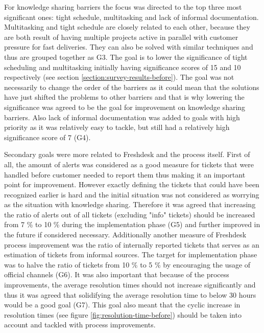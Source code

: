 For knowledge sharing barriers the focus was directed to the top three most significant ones: tight schedule, multitasking and lack of informal documentation. Multitasking and tight schedule
are closely related to each other, because they are both result of having multiple projects active in parallel with customer pressure for fast deliveries. They can also be solved with
similar techniques and thus are grouped together as G3. The goal is to lower the significance of tight scheduling and multitasking initially having significance scores of 15 and 10 respectively
(see section \ref{section:survey-results-before}). The goal was not necessarily to change the order of the barriers as it could mean that the solutions have just shifted the problems to other
barriers and that is why lowering the significance was agreed to be the goal for improvement on knowledge sharing barriers. Also lack of informal documentation was added to goals with high
priority as it was relatively easy to tackle, but still had a relatively high significance score of 7 (G4).

Secondary goals were more related to Freshdesk and the process itself. First of all, the amount of alerts was considered as a good measure for tickets that were handled before
customer needed to report them thus making it an important point for improvement. However exactly defining the tickets that could have been recognized earlier is hard and the initial
situation was not considered as worrying as the situation with knowledge sharing. Therefore it was agreed that increasing the ratio of alerts out of all tickets (excluding "info" tickets)
should be increased from 7 \% to 10 \% during the implementation phase (G5) and further improved in the future if considered necessary. Additionally another measure of Freshdesk process
improvement was the ratio of internally reported tickets that serves as an estimation of tickets from informal sources. The target for implementation phase was to halve the ratio of tickets
from 10 \% to 5 \% by encouraging the usage of official channels (G6). It was also important that because of the process improvements, the average resolution times should not increase
significantly and thus it was agreed that solidifying the average resolution time to below 30 hours would be a good goal (G7). This goal also meant that the cyclic increase in resolution
times (see figure \ref{fig:resolution-time-before}) should be taken into account and tackled with process improvements.

